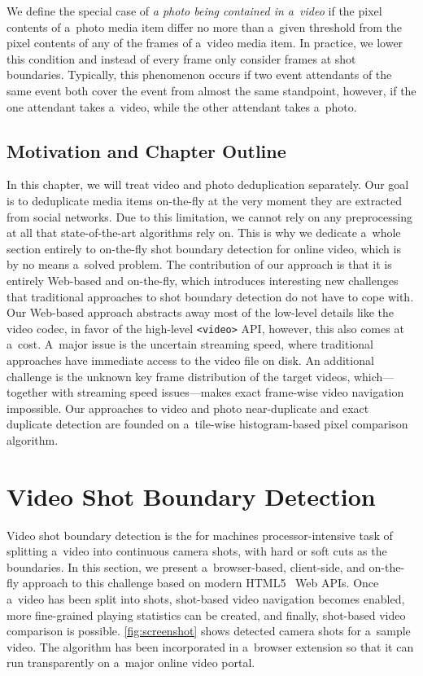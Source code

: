 We define the special case of
\emph{a photo being contained in a~video} if the pixel contents
of a~photo media item differ no more than a~given threshold from
the pixel contents of any of the frames of a~video media item.
In practice, we lower this condition and instead of every frame
only consider frames at shot boundaries.
Typically, this phenomenon occurs if two event attendants
of the same event both cover the event from almost the same
standpoint, however, if the one attendant takes a~video,
while the other attendant takes a~photo.

\subsection{Motivation and Chapter Outline}

In this chapter, we will treat video
and photo deduplication separately. 
Our goal is to deduplicate media items on-the-fly
at the very moment they are extracted from social networks.
Due to this limitation, we cannot rely on any preprocessing
at all that state-of-the-art algorithms rely on.
This is why we dedicate a~whole section entirely to on-the-fly
shot boundary detection for online video,
which is by no means a~solved problem.
The contribution of our approach is that it is entirely Web-based
and on-the-fly, which introduces interesting new challenges
that traditional approaches to shot boundary detection
do not have to cope with.
Our Web-based approach abstracts away most of the low-level details
like the video codec, in favor of the high-level \texttt{<video>}
API, however, this also comes at a~cost.
A~major issue is the uncertain streaming speed,
where traditional approaches have immediate access
to the video file on disk.
An additional challenge is the unknown key frame distribution
of the target videos, which---together with streaming speed
issues---makes exact frame-wise video navigation impossible.
Our approaches to video and photo near-duplicate
and exact duplicate detection are founded
on a~tile-wise histogram-based pixel comparison algorithm.

\section{Video Shot Boundary Detection}
Video shot boundary detection is the for machines processor-intensive task
of splitting a~video into continuous camera shots,
with hard or soft cuts as the boundaries.
In this section, we present a~browser-based, client-side, and
on-the-fly approach to this challenge
based on modern HTML5~\cite{berjon2012html5} Web APIs.
Once a~video has been split into shots,
shot-based video navigation becomes enabled,
more fine-grained playing statistics can be created,
and finally, shot-based video comparison is possible.
\autoref{fig:screenshot} shows detected camera
shots for a~sample video.
The algorithm has been incorporated in a~browser extension
so that it can run transparently on a~major online video portal.

